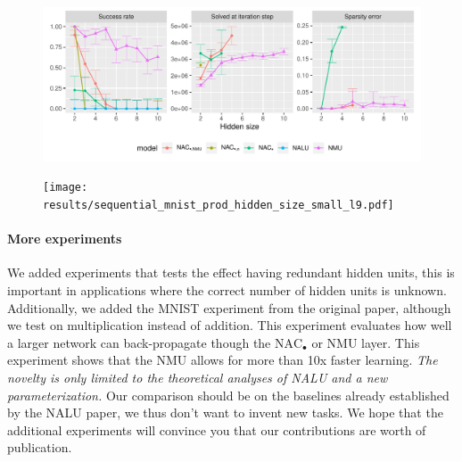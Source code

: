 \documentclass{article}
\begin{document}
\vspace{-0.3cm}\begin{figure}[h]
\centering
\begin{minipage}{.48\textwidth}
  \centering
  \includegraphics[width=\linewidth,trim={0 0 0 0},clip]{results/simple_function_static_mul_hidden_size.pdf}
  \vspace{-0.65cm}
  \label{fig:sft-hidden-size}
\end{minipage} \hspace{0.4cm}
\begin{minipage}{.48\textwidth}
  \centering
  \texttt{[image: results/sequential\_mnist\_prod\_hidden\_size\_small\_l9.pdf]}
  \vspace{-0.65cm}
  \label{fig:test2}
\end{minipage}
\end{figure}

\vspace{-0.5cm} \paragraph{More experiments} We added experiments that tests the effect having redundant hidden units, this is important in applications where the correct number of hidden units is unknown. Additionally, we added the MNIST experiment from the original paper, although we test on multiplication instead of addition. This experiment evaluates how well a larger network can back-propagate though the $\mathrm{NAC}_{\bullet}$ or NMU layer. This experiment shows that the NMU allows for more than 10x faster learning. \textit{The novelty is only limited to the theoretical analyses of NALU and a new parameterization.} Our comparison should be on the baselines already established by the NALU paper, we thus don't want to invent new tasks. We hope that the additional experiments will convince you that our contributions are worth of publication.
\end{document}
